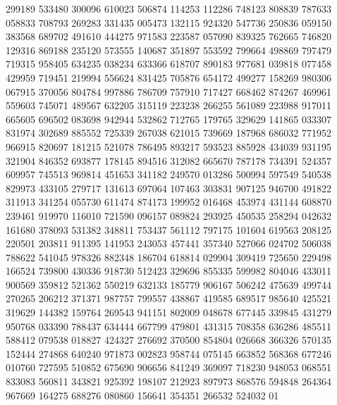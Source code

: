 {299189 533480 300096 610023 506874 114253 112286 748123 808839 787633 058833%
708793 269283 331435 005473 132115 924320 547736 250836 059150 383568 689702%
491610 444275 971583 223587 057090 839325 762665 746820 129316 869188 235120%
573555 140687 351897 553592 799664 498869 797479 719315 958405 634235 038234%
633366 618707 890183 977681 039818 077458 429959 719451 219994 556624 831425%
705876 654172 499277 158269 980306 067915 370056 804784 997886 786709 757910%
717427 668462 874267 469961 559603 745071 489567 632205 315119 223238 266255%
561089 223988 917011 665605 696502 083698 942944 532862 712765 179765 329629%
141865 033307 831974 302689 885552 725339 267038 621015 739669 187968 686032%
771952 966915 820697 181215 521078 786495 893217 593523 885928 434039 931195%
321904 846352 693877 178145 894516 312082 665670 787178 734391 524357 609957%
745513 969814 451653 341182 249570 013286 500994 597549 540538 829973 433105%
279717 131613 697064 107463 303831 907125 946700 491822 311913 341254 055730%
611474 874173 199952 016468 453974 431144 608870 239461 919970 116010 721590%
096157 089824 293925 450535 258294 042632 161680 378093 531382 348811 753437%
561112 797175 101604 619563 208125 220501 203811 911395 141953 243053 457441%
357340 527066 024702 506038 788622 541045 978326 882348 186704 618814 029904%
309419 725650 229498 166524 739800 430336 918730 512423 329696 855335 599982%
804046 433011 900569 359812 521362 550219 632133 185779 906167 506242 475639%
499744 270265 206212 371371 987757 799557 438867 419585 689517 985640 425521%
319629 144382 159764 269543 941151 802009 048678 677445 339845 431279 950768%
033390 788437 634444 667799 479801 431315 708358 636286 485511 588412 079538%
018827 424327 276692 370500 854804 026668 366326 570135 152444 274868 640240%
971873 002823 958744 075145 663852 568368 677246 010760 727595 510852 675690%
906656 841249 369097 718230 948053 068551 833083 560811 343821 925392 198107%
212923 897973 868576 594848 264364 967669 164275 688276 080860 156641 354351%
266532 524032 01%
}
